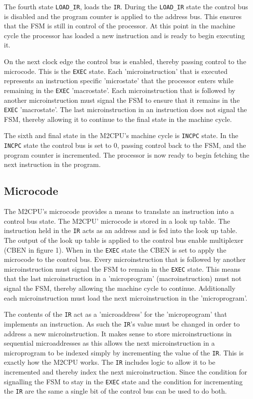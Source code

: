 \documentclass[a4paper,12pt]{article}
\newcommand{\mt}{M2CPU}
\newcommand{\IR}{\texttt{IR}}
\newcommand{\Lo}{\texttt{LOAD\_IR}}
\newcommand{\Ex}{\texttt{EXEC}}
\newcommand{\In}{\texttt{INCPC}}
\begin{document}
The fourth state \Lo{}, loads the \IR{}. During the \Lo{} state the control bus
is disabled and the program counter is applied to the address bus. This ensures
that the FSM is still in control of the processor. At this point in the machine
cycle the processor has loaded a new instruction and is ready to begin 
executing it. 
\par

On the next clock edge the control bus is enabled, thereby passing control to
the microcode. This is the \Ex{} state. Each 'microinstruction' that is 
executed represents an instruction specific 'microstate' that the processor
enters while remaining in the \Ex{} 'macrostate'. Each microinstruction that is
followed by another microinstruction must signal the FSM to ensure that it 
remains in the \Ex{} 'macrostate'. The last microinstruction in an instruction 
does not signal the FSM, thereby allowing it to continue to the final state in
the machine cycle.
\par

The sixth and final state in the \mt{}'s machine cycle is \In{} state. In the 
\In{} state the control bus is set to 0, passing control back to the FSM, and 
the program counter is incremented. The processor is now ready to begin 
fetching the next instruction in the program.
\par

\subsection{Microcode}
The \mt{}'s microcode provides a means to translate an instruction into a 
control bus state. The \mt{}' microcode is stored in a look up table. The
instruction held in the \IR{} acts as an address and is fed into the look up
table. The output of the look up table is applied to the control bus enable
multiplexer (CBEN in figure 1). When in the \Ex{} state the CBEN is set to
apply the microcode to the control bus. Every microinstruction that is followed
by another microinstruction must signal the FSM to remain in the \Ex{} state.
This means that the last microinstruction in a 'microprogram' 
(macroinstruction) must not signal the FSM, thereby allowing the machine cycle
to continue. Additionally each microinstruction must load the next 
microinstruction in the 'microprogram'.
\par

The contents of the \IR{} act as a 'microaddress' for the 'microprogram' that
implements an instruction. As such the \IR{}'s value must be changed in order
to address a new microinstruction. It makes sense to store microinstructions
in sequential microaddresses as this allows the next microinstruction in a
microprogram to be indexed simply by incrementing the value of the \IR{}. This
is exactly how the \mt{} works. The \IR{} includes logic to allow it to be 
incremented and thereby index the next microinstruction. Since the condition
for signalling the FSM to stay in the \Ex{} state and the condition for
incrementing the \IR{} are the same a single bit of the control bus can be used
to do both.
\par
\end{document}

